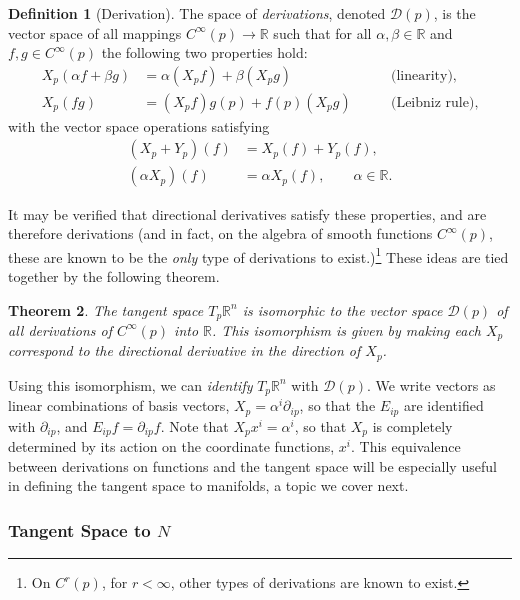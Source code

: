 \documentclass[psamsfonts]{amsart}
\newtheorem{thm}{Theorem}[section]
\theoremstyle{definition}
\newtheorem{defn}[thm]{Definition}
\theoremstyle{remark}
\newcommand*\R{\mathds{R}}
\numberwithin{equation}{section}
\begin{document}
\begin{defn}[Derivation]\label{def:derivations}
The space of \textit{derivations}, denoted $\mathscr{D}(p)$, is the vector space of all mappings $C^{\infty}(p)\rightarrow \R$ such that for all $\alpha, \beta \in \R$ and $f, g \in C^{\infty}(p)$ the following two properties hold:
\begin{equation}\label{eq:linleibniz}
\begin{aligned}
X_p(\alpha f + \beta g) & = {} \alpha (X_p f) + \beta (X_p g) \qquad & \text{(linearity)},\\
X_p(fg) & = {} (X_p f)g(p) + f(p)(X_p g) \qquad & \text{(Leibniz rule)},
\end{aligned}
\end{equation}
with the vector space operations satisfying 
\begin{equation}
\begin{aligned}
(X_p+Y_p)(f) &={} X_p(f) +Y_p(f), \\
(\alpha X_p)(f) &={}\alpha X_p (f), \qquad \alpha \in \R.
 \end{aligned}
 \end{equation}
\end{defn}
It may be verified that directional derivatives satisfy these properties, and are therefore derivations (and in fact, on the algebra of smooth functions $C^{\infty}(p)$, these are known to be the \textit{only} type of derivations to exist.)\footnote{On $C^r(p)$, for $r<\infty$, other types of derivations are known to exist.} These ideas are tied together by the following theorem. 
\begin{thm}
The tangent space $T_p\R^n$ is isomorphic to the vector space $\mathscr{D}(p)$ of all derivations of $C^{\infty}(p)$ into $\R$. This isomorphism is given by making each $X_p$ correspond to the directional derivative in the direction of $X_p$. 
\end{thm}

Using this isomorphism, we can \textit{identify} $T_p\R^n$ with $\mathscr{D}(p)$. We write vectors as linear combinations of basis vectors, $X_p = \alpha^i \partial_{ip}$, so that the $E_{ip}$ are identified with $\partial_{ip}$, and $E_{ip}f = \partial_{ip} f$. Note that $X_p x^i = \alpha^i$, so that $X_p$ is completely determined by its action on the coordinate functions, $x^i$. This equivalence between derivations on functions and the tangent space will be especially useful in defining the tangent space to manifolds, a topic we cover next. 

\subsubsection{Tangent Space to $N$}
\end{document}
